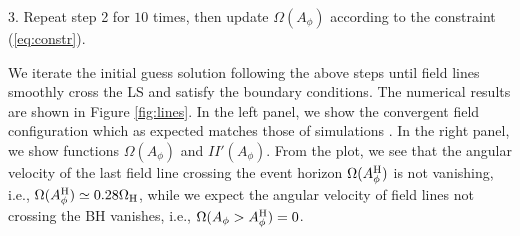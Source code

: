 \documentclass[iop,apj]{emulateapj}
\def\WH{\Omega_{\rm H}}
\def\AB{A_\phi^{\rm H}}
\begin{document}
3. Repeat step 2 for $10$ times, then update $\Omega(A_\phi)$ according to the constraint (\ref{eq:constr}).

We iterate the initial guess solution following the above steps until field lines smoothly
cross the LS and satisfy the boundary conditions.
The numerical results are shown in Figure \ref{fig:lines}.
In the left panel, we show the convergent field configuration
which as expected matches those of simulations \citep[e.g.][]{Komissarov2007}.
In the right panel, we show functions $\Omega(A_\phi)$ and $II'(A_\phi)$.
From the plot, we see that the angular velocity of the last field line crossing the event horizon
$\Omega(\AB)$ is not vanishing, i.e., $\Omega(\AB) \simeq 0.28\WH$,
while we expect the angular velocity of field lines not crossing the BH vanishes,
i.e., $\Omega(A_\phi > \AB) = 0$.
\end{document}
